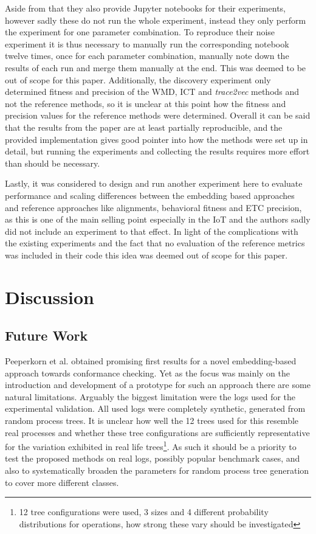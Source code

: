 \documentclass[runningheads]{template/llncs}
\begin{document}
Aside from that they also provide Jupyter notebooks for their experiments, however sadly these do not run the whole experiment, instead they only perform the experiment for one parameter combination.
To reproduce their noise experiment it is thus necessary to manually run the corresponding notebook twelve times, once for each parameter combination, manually note down the results of each run and merge them manually at the end.
This was deemed to be out of scope for this paper.
Additionally, the discovery experiment only determined fitness and precision of the WMD, ICT and \emph{trace2vec} methods and not the reference methods, so it is unclear at this point how the fitness and precision values for the reference methods were determined.
Overall it can be said that the results from the paper are at least partially reproducible, and the provided implementation gives good pointer into how the methods were set up in detail, but running the experiments and collecting the results requires more effort than should be necessary.

Lastly, it was considered to design and run another experiment here to evaluate performance and scaling differences between the embedding based approaches and reference approaches like alignments, behavioral fitness and ETC precision, as this is one of the main selling point especially in the IoT and the authors sadly did not include an experiment to that effect.
In light of the complications with the existing experiments and the fact that no evaluation of the reference metrics was included in their code this idea was deemed out of scope for this paper.

\section{Discussion}
\label{sec:discussion}
\subsection{Future Work}
Peeperkorn et al. obtained promising first results for a novel embedding-based approach towards conformance checking.
Yet as the focus was mainly on the introduction and development of a prototype for such an approach there are some natural limitations.
Arguably the biggest limitation were the logs used for the experimental validation.
All used logs were completely synthetic, generated from random process trees.
It is unclear how well the 12 trees used for this resemble real processes and whether these tree configurations are sufficiently representative for the variation exhibited in real life trees\footnote{12 tree configurations were used, 3 sizes and 4 different probability distributions for operations, how strong these vary should be investigated}.
As such it should be a priority to test the proposed methods on real logs, possibly popular benchmark cases, and also to systematically broaden the parameters for random process tree generation to cover more different classes.
\end{document}
